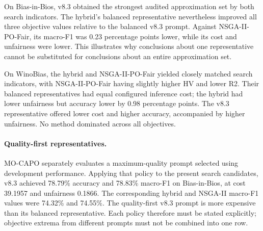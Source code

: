 \begin{table}[t]
\centering
\caption{Exploratory search results for seed 72. Each objective row refers to
the same balanced prompt. The indicators describe the two audited final
incumbents per method. No across-seed uncertainty is estimated.}
\end{table}

On Bias-in-Bios, v8.3 obtained the strongest audited approximation set by
both search indicators. The hybrid's balanced representative nevertheless
improved all three objective values relative to the balanced v8.3 prompt.
Against NSGA-II-PO-Fair, its macro-F1 was 0.23 percentage points lower,
while its cost and unfairness were lower. This illustrates why conclusions
about one representative cannot be substituted for conclusions about an
entire approximation set.

On WinoBias, the hybrid and NSGA-II-PO-Fair yielded closely matched search
indicators, with NSGA-II-PO-Fair having slightly higher HV and lower R2.
Their balanced representatives had equal configured inference cost; the
hybrid had lower unfairness but accuracy lower by 0.98 percentage points.
The v8.3 representative offered lower cost and higher accuracy, accompanied
by higher unfairness. No method dominated across all objectives.

\paragraph{Quality-first representatives.}
MO-CAPO separately evaluates a maximum-quality prompt selected using
development performance. Applying that policy to the present search
candidates, v8.3 achieved 78.79\% accuracy and 78.83\% macro-F1 on
Bias-in-Bios, at cost 39.1957 and unfairness 0.1866. The corresponding
hybrid and NSGA-II macro-F1 values were 74.32\% and 74.55\%.
The quality-first v8.3 prompt is more expensive than its balanced
representative. Each policy therefore must be stated explicitly; objective
extrema from different prompts must not be combined into one row.

